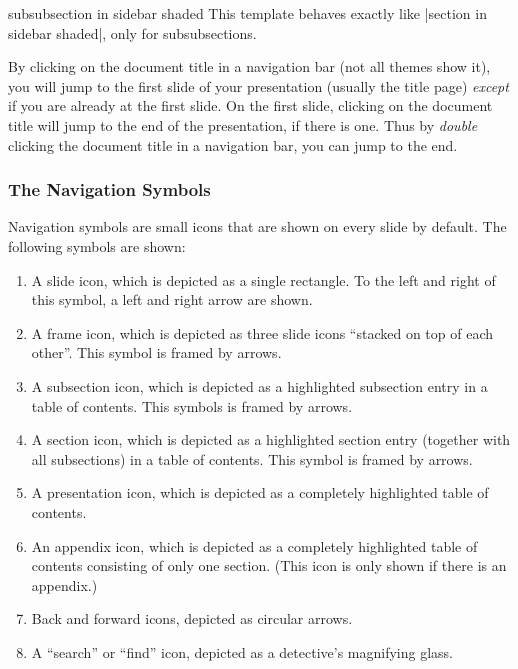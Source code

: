 \begin{element}{subsubsection in sidebar shaded}\yes\no\no
  This template behaves exactly like |section in sidebar shaded|,
  only for subsubsections. 
\end{element}

By clicking on the document title in a navigation bar (not all themes
show it), you will jump to the first slide of your presentation
(usually the title page) \emph{except} if you are already at the first
slide. On the first slide, clicking on the document title will jump to
the end of the presentation, if there is one. Thus by \emph{double}
clicking the document title in a navigation bar, you can jump to the end.



\subsubsection{The Navigation Symbols}
\label{section-navigation-symbols}


Navigation symbols are small icons that are shown on every slide
by default. The following symbols are shown: 
\begin{enumerate}
\item
  A slide icon, which is depicted as  a single rectangle. To the left and
  right of this symbol, a left and right arrow are shown.
\item
  A frame icon, which is depicted as three slide icons ``stacked on top of
  each other''. This symbol is framed by arrows.
\item
  A subsection icon, which is depicted as a highlighted subsection
  entry in a table of contents. This  symbols is framed by arrows.
\item
  A section icon, which is depicted as a highlighted section entry
  (together with all subsections) in a table of contents. This symbol
  is framed by arrows.
\item
  A presentation icon, which is depicted as a completely highlighted
  table of contents.
\item
  An appendix icon, which is depicted as a completely highlighted
  table of contents consisting of only one section. (This icon is only
  shown if there is an appendix.)
\item
  Back and forward icons, depicted as circular arrows.
\item
  A ``search'' or ``find'' icon, depicted as a detective's
  magnifying glass.
\end{enumerate}


